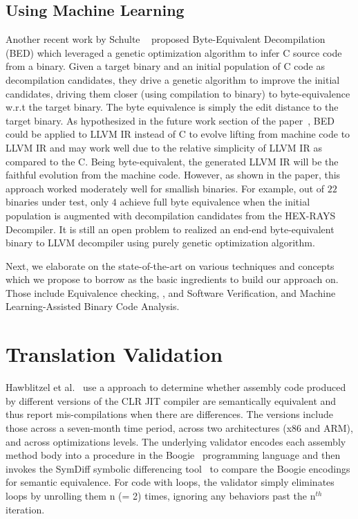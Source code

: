 \subsection{Using Machine Learning} Another recent work by Schulte
\etal~\cite{eschulte2018bed} proposed Byte-Equivalent Decompilation (BED) which
leveraged a genetic optimization algorithm to infer C source code from a
binary. Given a target binary and an initial population of C code as
decompilation candidates, they  drive a genetic algorithm to improve the
initial candidates, driving them closer (using compilation to binary) to
byte-equivalence w.r.t the target binary. The byte equivalence  is simply the
edit distance to the target binary. As hypothesized in the future work section
of the paper~\cite{eschulte2018bed}, BED could be applied to LLVM IR instead of
C to evolve lifting from machine code to LLVM IR and may work well due to the
relative simplicity of LLVM IR as compared to the C. Being byte-equivalent, the
generated LLVM IR will be the faithful evolution from the machine code.
However, as shown in the paper, this approach worked moderately well for
smallish binaries. For example, out of $22$ binaries under test, only $4$ achieve full byte equivalence when the initial
    population is augmented with decompilation candidates from the
    HEX-RAYS~\cite{hexray} Decompiler. It is still an open problem to realized
    an end-end byte-equivalent binary to LLVM decompiler using purely genetic
    optimization algorithm. 

Next, we elaborate on the state-of-the-art on various techniques and concepts
which we propose to borrow as the basic ingredients to build our approach on. Those
include Equivalence checking, \TV, and Software Verification, and Machine Learning-Assisted Binary Code Analysis.

\section{Translation Validation}

Hawblitzel et al.~\cite{Hawblitzel:FSE2013} use a \tv approach to determine
whether assembly code produced by different versions of the CLR JIT compiler
are semantically equivalent and thus report mis-compilations when there are
differences. The versions include those across a seven-month time period,
  across two architectures (x86 and ARM), and across optimizations levels. The
  underlying validator encodes each assembly method body into a procedure in
  the Boogie~\cite{Boogie:2005}  programming language and then invokes the
  SymDiff symbolic differencing tool~\cite{SYMDIFF:2012} to compare the Boogie
  encodings for semantic equivalence. For code with loops, the validator simply
  eliminates loops by unrolling them n (= 2) times, ignoring any behaviors past
  the n$^{th}$ iteration.
 
